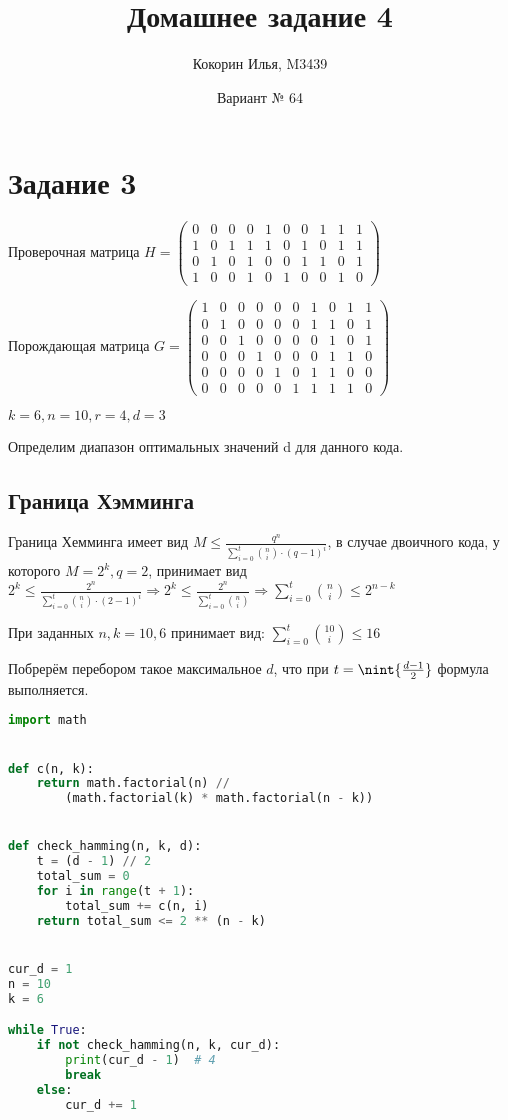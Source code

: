 \documentclass{article}
\title{Домашнее задание 4}
\author{Кокорин Илья, M3439}
\date{Вариант № 64}
\DeclarePairedDelimiter{\nint}\lfloor\rfloor
\begin{document}
	\maketitle
	\section{Задание 3}
	Проверочная матрица
	$
	H = \left(
	\begin{array}{cccccccccc}
	0 & 0 & 0 & 0 & 1 & 0 & 0 & 1 & 1 & 1\\
	1 & 0 & 1 & 1 & 1 & 0 & 1 & 0 & 1 & 1\\
	0 & 1 & 0 & 1 & 0 & 0 & 1 & 1 & 0 & 1\\
	1 & 0 & 0 & 1 & 0 & 1 & 0 & 0 & 1 & 0
	\end{array}
	\right)
	$
	
	Порождающая матрица $
	G = \left(
	\begin{array}{cccccccccc}
	1& 0& 0& 0& 0& 0   & 1& 0& 1& 1  \\
	0& 1& 0& 0& 0& 0   & 1& 1& 0& 1  \\
	0 &0 &1 &0 &0 &0   & 0 &1 &0 &1 \\ 
	0 &0 &0 &1 &0 &0   & 0 &1 &1 &0 \\
	0 &0 &0 &0 &1 &0   & 1 &1 &0 &0  \\
	0 &0 &0 &0 &0 &1  & 1 &1 &1 &0 
	\end{array}
	\right)
	$
	
	$k = 6, n = 10, r = 4, d = 3$
	
	Определим диапазон оптимальных значений d для данного кода.
	
	\subsection{Граница Хэмминга}
	
	Граница Хемминга имеет вид $M \leq \frac{q^n}{\sum\limits_{i = 0}^t \binom{n}{i} \cdot (q - 1)^i}$, в случае двоичного кода, у которого $M = 2^k, q = 2$, принимает вид $2^k \leq \frac{2^n}{\sum\limits_{i = 0}^t \binom{n}{i} \cdot (2 - 1)^i} \Rightarrow 2^k \leq \frac{2^n}{\sum\limits_{i = 0}^t \binom{n}{i}} \Rightarrow \sum\limits_{i = 0}^t \binom{n}{i} \leq 2^{n - k}$
	
	При заданных $n, k = 10, 6$ принимает вид: $\sum\limits_{i = 0}^t \binom{10}{i} \leq 16$
	
	Побрерём перебором такое максимальное $d$, что при $t = \nint{\frac{d - 1}{2}}$ формула выполняется.
	
	\begin{lstlisting}[language=python]
import math


def c(n, k):
	return math.factorial(n) // 
		(math.factorial(k) * math.factorial(n - k))


def check_hamming(n, k, d):
	t = (d - 1) // 2
	total_sum = 0
	for i in range(t + 1):
		total_sum += c(n, i)
	return total_sum <= 2 ** (n - k)


cur_d = 1
n = 10
k = 6

while True:
	if not check_hamming(n, k, cur_d):
		print(cur_d - 1)  # 4
		break
	else:
		cur_d += 1
	\end{lstlisting}
	
\end{document}
